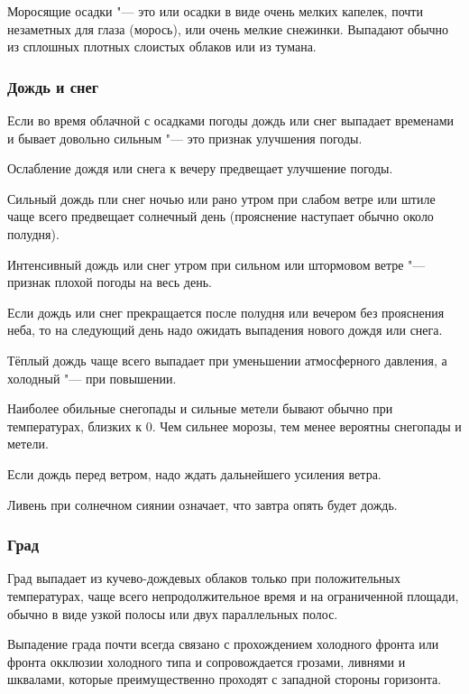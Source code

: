 Моросящие осадки "--- это или осадки в виде очень мелких капелек, почти
незаметных для глаза (морось), или очень мелкие снежинки. Выпадают
обычно из сплошных плотных слоистых облаков или из тумана.

\subsubsection{Дождь и снег}

 Если во время облачной с осадками погоды дождь или снег выпадает
временами и бывает довольно сильным "--- это признак улучшения погоды.

 Ослабление дождя или снега к вечеру предвещает улучшение погоды.

 Сильный дождь пли снег ночью или рано утром при слабом ветре
или штиле чаще всего предвещает солнечный день (прояснение наступает
обычно около полудня).

 Интенсивный дождь или снег утром при сильном или штормовом
ветре "--- признак плохой погоды на весь день.

 Если дождь или снег прекращается после полудня или вечером без
прояснения неба, то на следующий день надо ожидать выпадения нового
дождя или снега.

 Тёплый дождь чаще всего выпадает при уменьшении атмосферного
давления, а холодный "--- при повышении.

 Наиболее обильные снегопады и сильные метели бывают обычно при
температурах, близких к 0\grC. Чем сильнее морозы, тем менее вероятны
снегопады и метели.

 Если дождь перед ветром, надо ждать дальнейшего усиления ветра.

 Ливень при солнечном сиянии означает, что завтра опять будет дождь.

\subsubsection{Град}

Град выпадает из кучево-дождевых облаков только при положительных
температурах, чаще всего непродолжительное время и на ограниченной
площади, обычно в виде узкой полосы или двух параллельных полос.

 Выпадение града почти всегда связано с прохождением холодного
фронта или фронта окклюзии холодного типа и сопровождается грозами,
ливнями и шквалами, которые преимущественно проходят с западной
стороны горизонта.

